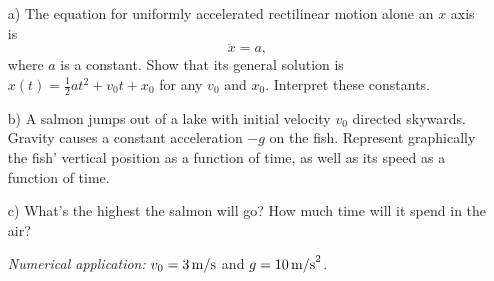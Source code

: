 %
%

\begin{center}
\vspace*{5mm}
\end{center}

\begin{enumerate}
\item[a)] The equation for uniformly accelerated rectilinear motion alone an $x$ axis is  
\[
\ddot{x} = a ,
\]
where $a$ is a constant. Show that its general solution is $x(t) = \frac{1}{2}at^2 + v_0t + x_0$ for any $v_0$ and $x_0$. Interpret these constants.

\item[b)] A salmon jumps out of a lake with initial velocity $v_0$ directed skywards. Gravity causes a constant acceleration $-g$ on the fish. Represent graphically the fish' vertical position as a function of time, as well as its speed as a function of time.

\item[c)] What's the highest the salmon will go? How much time will it spend in the air?

\emph{Numerical application:} $v_0 = 3\, {\rm m/s}$ and $g = 10\, {\rm m/s}^2$.  \\

\end{enumerate}

